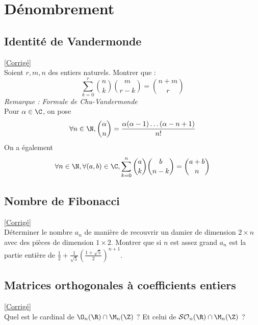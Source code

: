 \documentclass[8pt]{book}
\begin{document}
\chapter{Dénombrement}
\section{Identité de Vandermonde }
\label{Identité de Vandermonde}
\textcolor{blue}{\hyperref[Identité de Vandermonde corrigé]{[Corrigé]}}\\
Soient $r,m,n$ des entiers naturels. Montrer que : $$\sum_{k=0}^r\binom{n}{k}\binom{m}{r-k}=\binom{n+m}{r}$$
\textit{Remarque : Formule de Chu-Vandermonde}\\
Pour $\alpha\in\C$, on pose $$\forall n\in\N, \binom{\alpha}{n}=\frac{\alpha(\alpha-1)\dots(\alpha-n+1)}{n!}$$
On a également $$\forall n\in \N, \forall (a,b)\in\C ,\sum_{k=0}^n\binom{a}{k}\binom{b}{n-k}=\binom{a+b}{n}$$

\section{Nombre de Fibonacci }
\label{Nombre de Fibonacci}
\textcolor{blue}{\hyperref[Nombre de Fibonacci corrigé]{[Corrigé]}}\\
Déterminer le nombre $a_n$ de manière de recouvrir un damier de dimension $2\times n$ avec des pièces de dimension $1\times 2$. Montrer que si $n$ est assez grand $a_n$ est la partie entière de $\displaystyle\frac{1}{2}+\frac{1}{\sqrt{5}}\left(\frac{1+\sqrt{5}}{2}\right)^{n+1}$.

\section{Matrices orthogonales à coefficients entiers }
\label{Matrices orthogonales à coefficients entiers}
\textcolor{blue}{\hyperref[Matrices orthogonales à coefficients entiers corrigé]{[Corrigé]}}\\
Quel est le cardinal de $\O_n(\R) \cap \M_n(\Z)$ ? Et celui de $\mathcal{SO}_n(\R)\cap \M_n(\Z)$ ?
\end{document}
